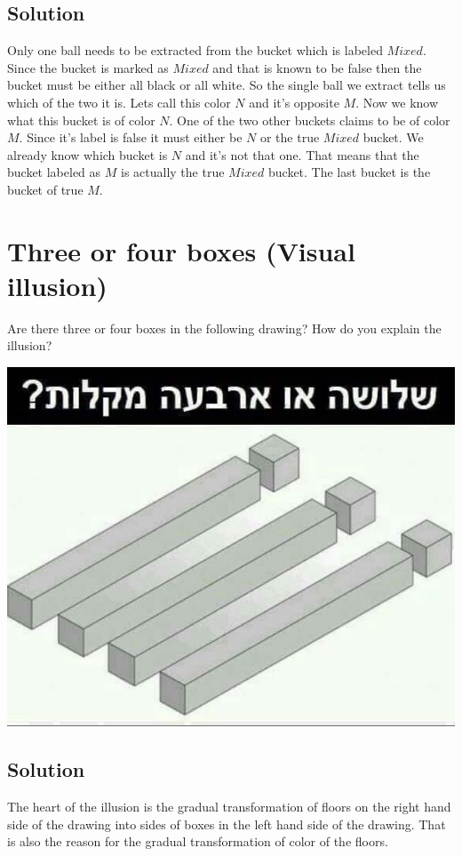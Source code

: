 \documentclass{article}
\begin{document}
\subsection{Solution}
Only one ball needs to be extracted from the bucket which is labeled $Mixed$. Since the bucket is marked as $Mixed$ and that is known to be false then the bucket must be either all black or all white. So the single ball we extract tells us which of the two it is. Lets call this color $N$ and it's opposite $M$. Now we know what this bucket is of color $N$. One of the two other buckets claims to be of color $M$. Since it's label is false it must either be $N$ or the true $Mixed$ bucket. We already know which bucket is $N$ and it's not that one. That means that the bucket labeled as $M$ is actually the true $Mixed$ bucket. The last bucket is the bucket of true $M$.

\section {Three or four boxes (Visual illusion)}
Are there three or four boxes in the following drawing? How do you explain the illusion?

\includegraphics[scale=.5]{src/jpg/3-4-sticks.jpg}

\subsection{Solution}
The heart of the illusion is the gradual transformation of floors on the right hand side of the drawing into sides of boxes in the left hand side of the drawing. That is also the reason for the gradual transformation of color of the floors.
\end{document}
